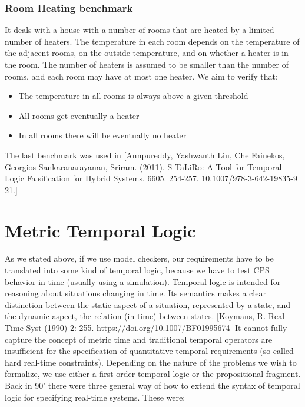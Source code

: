 \subsubsection{Room Heating benchmark}

It deals with a house with a number of rooms that are heated by a limited number of heaters. The temperature in each room depends on the temperature of the adjacent rooms, on the outside temperature, and on whether a heater is in the room. The number of heaters is assumed to be smaller than the number of rooms, and each room may have at most one heater. We aim to verify that:

\begin{itemize}
	\item The temperature in all rooms is always above a given threshold
	\item All rooms get eventually a heater
	\item In all rooms there will be eventually no heater
\end{itemize}

The last benchmark was used in [Annpureddy, Yashwanth Liu, Che  Fainekos, Georgios  Sankaranarayanan, Sriram. (2011). S-TaLiRo: A Tool for Temporal Logic Falsification for Hybrid Systems. 6605. 254-257. 10.1007/978-3-642-19835-9 21.]

\section{Metric Temporal Logic}

As we stated above, if we use model checkers, our requirements have to be translated into some kind of temporal logic, because we have to test CPS behavior in time (usually using a simulation). Temporal logic is intended for reasoning about situations changing in time. Its semantics makes a clear distinction between the static aspect of a situation, represented by a state, and the dynamic aspect, the relation (in time) between states. [Koymans, R. Real-Time Syst (1990) 2: 255. https://doi.org/10.1007/BF01995674] It cannot fully capture the concept of metric time and traditional temporal operators are insufficient for the specification of quantitative temporal requirements (so-called hard real-time constraints). Depending on the nature of the problems we wish to formalize, we use either a first-order temporal logic or the propositional fragment. Back in 90’ there were three general way of how to extend the syntax of temporal logic for specifying real-time systems. These were:

